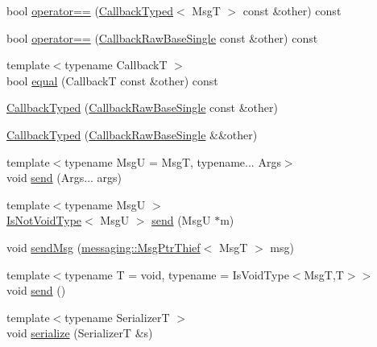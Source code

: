 \begin{DoxyCompactItemize}
bool \hyperlink{structvt_1_1pipe_1_1callback_1_1cbunion_1_1_callback_typed_a6b88345f0d05d52a67730ffecaf68917}{operator==} (\hyperlink{structvt_1_1pipe_1_1callback_1_1cbunion_1_1_callback_typed}{Callback\+Typed}$<$ MsgT $>$ const \&other) const
\item 
bool \hyperlink{structvt_1_1pipe_1_1callback_1_1cbunion_1_1_callback_typed_a8ce2b5aa8087f7ff59e90c92d4d48c0f}{operator==} (\hyperlink{structvt_1_1pipe_1_1callback_1_1cbunion_1_1_callback_raw_base_single}{Callback\+Raw\+Base\+Single} const \&other) const
\item 
{\footnotesize template$<$typename CallbackT $>$ }\\bool \hyperlink{structvt_1_1pipe_1_1callback_1_1cbunion_1_1_callback_typed_a2c1b0eea2a4e14dc85a6ab889bd6a644}{equal} (CallbackT const \&other) const
\item 
\hyperlink{structvt_1_1pipe_1_1callback_1_1cbunion_1_1_callback_typed_a3cb4289b3d7353d03fcdfb6d7c52bb7a}{Callback\+Typed} (\hyperlink{structvt_1_1pipe_1_1callback_1_1cbunion_1_1_callback_raw_base_single}{Callback\+Raw\+Base\+Single} const \&other)
\item 
\hyperlink{structvt_1_1pipe_1_1callback_1_1cbunion_1_1_callback_typed_a51d3fdb7b8b73d077a76d79a52343794}{Callback\+Typed} (\hyperlink{structvt_1_1pipe_1_1callback_1_1cbunion_1_1_callback_raw_base_single}{Callback\+Raw\+Base\+Single} \&\&other)
\item 
{\footnotesize template$<$typename MsgU  = MsgT, typename... Args$>$ }\\void \hyperlink{structvt_1_1pipe_1_1callback_1_1cbunion_1_1_callback_typed_ad4cfe4ed3a311c21a596ca5d97bc8858}{send} (Args... args)
\item 
{\footnotesize template$<$typename MsgU $>$ }\\\hyperlink{structvt_1_1pipe_1_1callback_1_1cbunion_1_1_callback_typed_a57e15e61b171c50bff2e7a0dd9078f46}{Is\+Not\+Void\+Type}$<$ MsgU $>$ \hyperlink{structvt_1_1pipe_1_1callback_1_1cbunion_1_1_callback_typed_afdbf535b3210a84aaaeae0b9b3edc35f}{send} (MsgU $\ast$m)
\item 
void \hyperlink{structvt_1_1pipe_1_1callback_1_1cbunion_1_1_callback_typed_afd8456a0ee9a572847f65a7f24c10a66}{send\+Msg} (\hyperlink{structvt_1_1messaging_1_1_msg_ptr_thief}{messaging\+::\+Msg\+Ptr\+Thief}$<$ MsgT $>$ msg)
\item 
{\footnotesize template$<$typename T  = void, typename  = Is\+Void\+Type$<$\+Msg\+T,\+T$>$$>$ }\\void \hyperlink{structvt_1_1pipe_1_1callback_1_1cbunion_1_1_callback_typed_aa118972d857f12ec7433e01440b2dfd3}{send} ()
\item 
{\footnotesize template$<$typename SerializerT $>$ }\\void \hyperlink{structvt_1_1pipe_1_1callback_1_1cbunion_1_1_callback_typed_adf664b7850b5c89afd0abdac51bba0ed}{serialize} (SerializerT \&s)
\end{DoxyCompactItemize}

